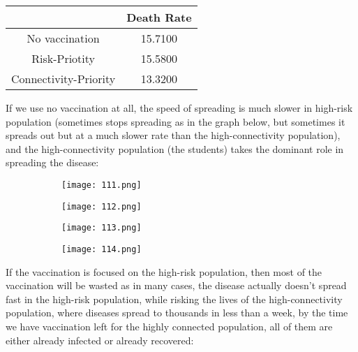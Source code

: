 \documentclass[titlepage]{article}
\begin{document}
\begin{center}
\begin{tabular}{ | c | c | }
\hline
 & Death Rate\\\hline
No vaccination & 15.7100\\\hline
Risk-Priotity & 15.5800\\\hline
Connectivity-Priority & 13.3200\\
\hline
\end{tabular}
\end{center}

If we use no vaccination at all, the speed of spreading is much slower in high-risk population (sometimes stops spreading as in the graph below, but sometimes it spreads out but at a much slower rate than the high-connectivity population), and the high-connectivity population (the students) takes the dominant role in spreading the disease:


\begin{figure}[H]
       \centering
       \begin{subfigure}{0.48\textwidth}
       \centering
       \texttt{[image: 111.png]}
       \end{subfigure}\quad
       \begin{subfigure}{0.48\textwidth}
       \centering
       \texttt{[image: 112.png]}
       \end{subfigure}
              \begin{subfigure}{0.48\textwidth}
       \centering
       \texttt{[image: 113.png]}
       \end{subfigure}\quad
       \begin{subfigure}{0.48\textwidth}
       \centering
       \texttt{[image: 114.png]}
       \end{subfigure}
\end{figure}

If the vaccination is focused on the high-risk population, then most of the vaccination will be wasted as in many cases, the disease actually doesn't spread fast in the high-risk population, while risking the lives of the high-connectivity population, where diseases spread to thousands in less than a week, by the time we have vaccination left for the highly connected population, all of them are either already infected or already recovered:
\end{document}
